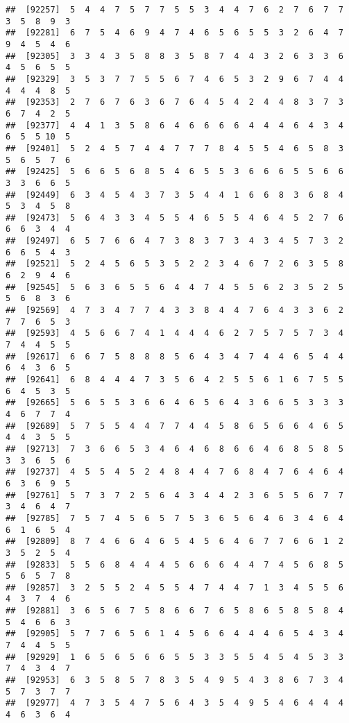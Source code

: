 \documentclass[
]{book}
\begin{document}
\begin{verbatim}
##  [92257]  5  4  4  7  5  7  7  5  5  3  4  4  7  6  2  7  6  7  7  3  5  8  9  3
##  [92281]  6  7  5  4  6  9  4  7  4  6  5  6  5  5  3  2  6  4  7  9  4  5  4  6
##  [92305]  3  3  4  3  5  8  8  3  5  8  7  4  4  3  2  6  3  3  6  4  5  6  5  5
##  [92329]  3  5  3  7  7  5  5  6  7  4  6  5  3  2  9  6  7  4  4  4  4  4  8  5
##  [92353]  2  7  6  7  6  3  6  7  6  4  5  4  2  4  4  8  3  7  3  6  7  4  2  5
##  [92377]  4  4  1  3  5  8  6  4  6  6  6  6  4  4  4  6  4  3  4  6  5  5 10  5
##  [92401]  5  2  4  5  7  4  4  7  7  7  8  4  5  5  4  6  5  8  3  5  6  5  7  6
##  [92425]  5  6  6  5  6  8  5  4  6  5  5  3  6  6  6  5  5  6  6  3  3  6  6  5
##  [92449]  6  3  4  5  4  3  7  3  5  4  4  1  6  6  8  3  6  8  4  5  3  4  5  8
##  [92473]  5  6  4  3  3  4  5  5  4  6  5  5  4  6  4  5  2  7  6  6  6  3  4  4
##  [92497]  6  5  7  6  6  4  7  3  8  3  7  3  4  3  4  5  7  3  2  6  6  5  4  3
##  [92521]  5  2  4  5  6  5  3  5  2  2  3  4  6  7  2  6  3  5  8  6  2  9  4  6
##  [92545]  5  6  3  6  5  5  6  4  4  7  4  5  5  6  2  3  5  2  5  5  6  8  3  6
##  [92569]  4  7  3  4  7  7  4  3  3  8  4  4  7  6  4  3  3  6  2  7  7  6  5  3
##  [92593]  4  5  6  6  7  4  1  4  4  4  6  2  7  5  7  5  7  3  4  7  4  4  5  5
##  [92617]  6  6  7  5  8  8  8  5  6  4  3  4  7  4  4  6  5  4  4  6  4  3  6  5
##  [92641]  6  8  4  4  4  7  3  5  6  4  2  5  5  6  1  6  7  5  5  6  4  5  3  5
##  [92665]  5  6  5  5  3  6  6  4  6  5  6  4  3  6  6  5  3  3  3  4  6  7  7  4
##  [92689]  5  7  5  5  4  4  7  7  4  4  5  8  6  5  6  6  4  6  5  4  4  3  5  5
##  [92713]  7  3  6  6  5  3  4  6  4  6  8  6  6  4  6  8  5  8  5  3  3  6  5  6
##  [92737]  4  5  5  4  5  2  4  8  4  4  7  6  8  4  7  6  4  6  4  6  3  6  9  5
##  [92761]  5  7  3  7  2  5  6  4  3  4  4  2  3  6  5  5  6  7  7  3  4  6  4  7
##  [92785]  7  5  7  4  5  6  5  7  5  3  6  5  6  4  6  3  4  6  4  6  1  6  5  4
##  [92809]  8  7  4  6  6  4  6  5  4  5  6  4  6  7  7  6  6  1  2  3  5  2  5  4
##  [92833]  5  5  6  8  4  4  4  5  6  6  6  4  4  7  4  5  6  8  5  5  6  5  7  8
##  [92857]  3  2  5  5  2  4  5  5  4  7  4  4  7  1  3  4  5  5  6  4  3  7  4  6
##  [92881]  3  6  5  6  7  5  8  6  6  7  6  5  8  6  5  8  5  8  4  5  4  6  6  3
##  [92905]  5  7  7  6  5  6  1  4  5  6  6  4  4  4  6  5  4  3  4  7  4  4  5  5
##  [92929]  1  6  5  6  5  6  6  5  5  3  3  5  5  4  5  4  5  3  3  7  4  3  4  7
##  [92953]  6  3  5  8  5  7  8  3  5  4  9  5  4  3  8  6  7  3  4  5  7  3  7  7
##  [92977]  4  7  3  5  4  7  5  6  4  3  5  4  9  5  4  6  4  4  4  4  6  3  6  4

\end{verbatim}
\end{document}
